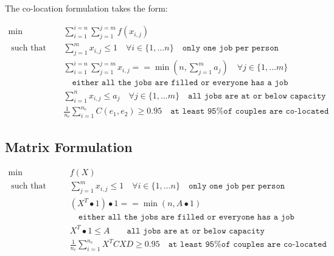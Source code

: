 
The co-location formulation takes the form:

\begin{align}
\min \qquad & \sum_{i = 1}^{i=n} \sum_{j = 1}^{j=m} f(x_{i,j}) \\
\text{ such that } \qquad & \sum_{j=1}^m x_{i,j} \leq 1 \quad  \forall i \in \{1, \dots n\} \quad \texttt{only one job per person} \\
& \sum_{i = 1}^{i=n} \sum_{j = 1}^{j=m}x_{i,j} == \min \left(n,\sum_{j = 1}^{m}a_j \right) \quad  \forall j \in \{1, \dots m\} \\& \quad \texttt{either all the jobs are filled or everyone has a job} \\
& \sum_{i=1}^n x_{i,j} \leq a_j \quad  \forall j \in \{1, \dots m\} \quad \texttt{all jobs are at or below capacity} \\
& \frac{1}{n_c} \sum_{i=1}^{n_e} C(e_1, e_2) \geq 0.95 \quad \texttt{at least 95\% of couples are co-located}
\end{align}




\subsection{Matrix Formulation}

\begin{align}
\min \qquad & f(X) \\
\text{ such that } \qquad & \sum_{j=1}^m x_{i,j} \leq 1 \quad  \forall i \in \{1, \dots n\} \quad \texttt{only one job per person} \\
& (X^T \bullet 1) \bullet 1 == \min(n, A \bullet 1) \\& \quad \texttt{either all the jobs are filled or everyone has a job} \\
& X^T \bullet 1 \leq A \quad \quad \texttt{all jobs are at or below capacity} \\
& \frac{1}{n_c} \sum_{i=1}^{n_e} X^TCXD \geq 0.95 \quad \texttt{at least 95\% of couples are co-located}
\end{align}


